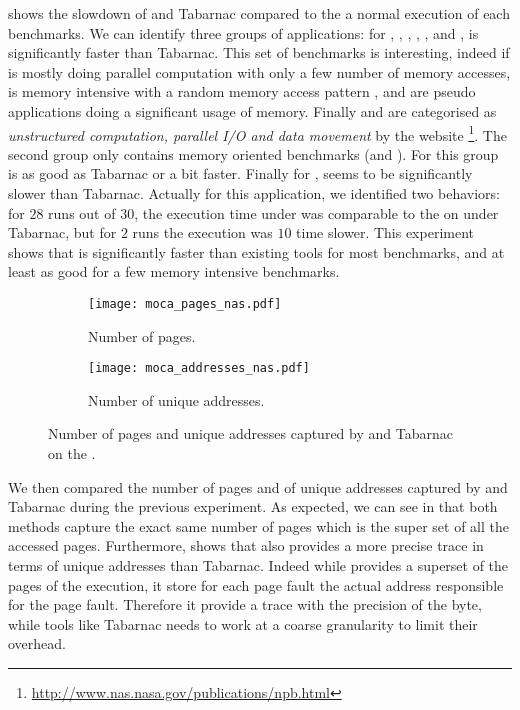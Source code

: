  shows the slowdown of \Moca and Tabarnac compared to the
a normal execution of each benchmarks. We can identify three groups of
applications:  for \BT, \DC, \EP, \IS, \LU, \SP and \UA, \Moca is
significantly faster than Tabarnac. This set of benchmarks is interesting,
indeed if \EP is mostly doing parallel computation with only a few number of
memory accesses, \IS is memory intensive with a random memory access pattern
\BT, \LU and \SP are pseudo applications doing a significant usage of memory.
Finally \DC and \UA are categorised as \emph{unstructured computation,
parallel I/O and data movement} by the \NPB website
\footnote{\url{http://www.nas.nasa.gov/publications/npb.html}}. The second
group only contains memory oriented benchmarks (\CG and \FT). For this group
\Moca is as good as Tabarnac or a bit faster. Finally for \MG, \Moca seems to
be significantly slower than Tabarnac. Actually for this application, we
identified two behaviors: for $28$ runs out of $30$, the execution time under
\Moca was comparable to the on under Tabarnac, but for $2$ runs the execution
was $10$ time slower.
This experiment shows that \Moca is significantly faster than existing tools
for most benchmarks, and at least as good for a few memory intensive
benchmarks.

\begin{figure}[htb]
    \centering
    \begin{subfigure}{\linewidth}
        \texttt{[image: moca\_pages\_nas.pdf]}
        \caption{Number of pages.}
        \label{fig:pages}
    \end{subfigure}
    \begin{subfigure}{\linewidth}
        \texttt{[image: moca\_addresses\_nas.pdf]}
        \caption{Number of unique addresses.}
        \label{fig:addr}
    \end{subfigure}
    \caption{Number of pages and unique addresses captured by \Moca and Tabarnac
    on the \NPB.}
    \label{fig:pages-addr}
\end{figure}

We then compared the number of pages and of unique addresses captured by \Moca
and Tabarnac during the previous experiment. As expected, we can see in
 that both methods capture the exact same number of
pages which is the super set of all the accessed pages. Furthermore,
 shows that \Moca also provides a more precise trace in
terms of unique addresses than Tabarnac. Indeed while \Moca provides a
superset of the pages of the execution, it store for each page fault the
actual address responsible for the page fault. Therefore it provide a trace
with the precision of the byte, while tools like Tabarnac needs to work at a
coarse granularity to limit their overhead.

